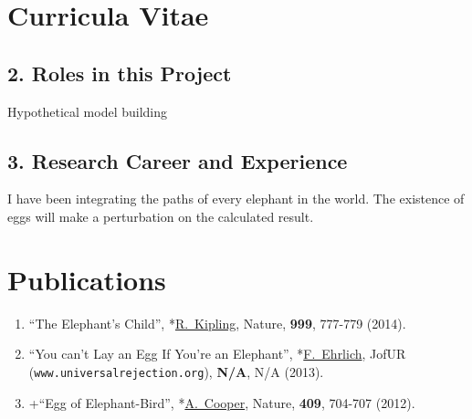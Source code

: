 
\section{Curricula Vitae}

\renewcommand{\Name}{Shinichiro TOMONAGA}
\renewcommand{\DateOfBirth}{Apr. 31, 1900}
\renewcommand{\Age}{137}
\renewcommand{\AffiliationPosition}{\small{Edo University, School of Science., Professor Emeritus}}
\renewcommand{\Degree}{Ph.~D}

\vspace*{-8mm}
\subsection*{2. Roles in this Project}
	Hypothetical model building

\subsection*{3. Research Career and Experience}
	I have been integrating the paths of every elephant in the world.
	The existence of eggs will make a perturbation on the calculated result.




\section{Publications}


\PapersInstructions	%
	\begin{enumerate}
		\item \label{pub:abe} ``The Elephant's Child'', 
				*\underline{R.~Kipling},
				Nature, {\bf 999}, 777-779 (2014). 

		\item ``You can't Lay an Egg If You're an Elephant'', 
				*\underline{F.~Ehrlich},
				JofUR\\
				 ({\tt www.universalrejection.org}), {\bf N/A}, N/A (2013). 
		\item +``Egg of Elephant-Bird'', 
				*\underline{A.~Cooper},
				Nature, {\bf 409}, 704-707 (2012). 
	\end{enumerate}

